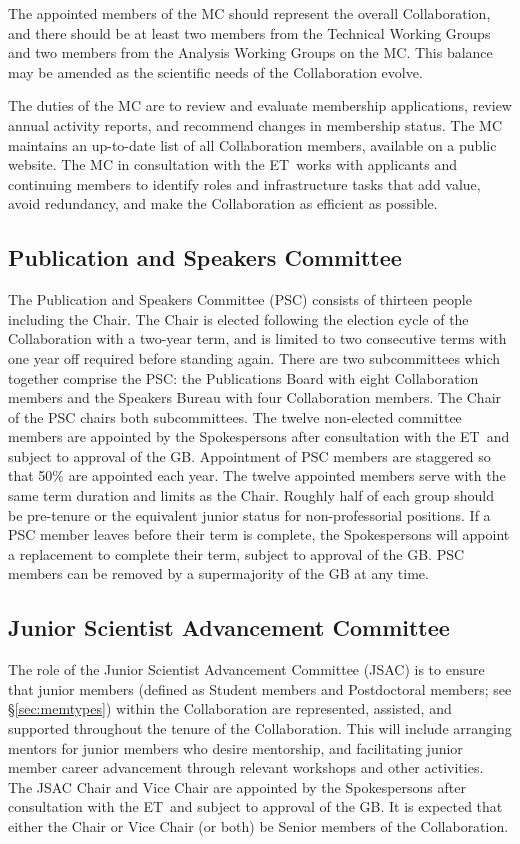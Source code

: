 \documentclass[12pt]{article}
\newcommand{\exec}{{Executive Team}}
\newcommand{\shorte}{{ET}}  %
\begin{document}
The appointed members of the MC should represent the overall Collaboration, and there should be at least two members from the Technical Working Groups and two members from the Analysis Working Groups on the MC.  This balance may be amended as the scientific needs of the Collaboration evolve.

The duties of the MC  are to review and evaluate membership applications, review annual activity reports, and recommend changes in membership status. The MC maintains an up-to-date list of all Collaboration members, available on a public website.  The MC in consultation with the \shorte\ works with applicants and continuing members to identify roles and infrastructure tasks that add value, avoid redundancy, and make the Collaboration as efficient as possible.

\subsection{Publication and Speakers  Committee}
\label{sec:pubcouncil}

The Publication and Speakers Committee (PSC) consists of thirteen people including the Chair. The Chair is elected following the election cycle of the Collaboration with a two-year term, and is limited to two consecutive terms with one year off required before standing again. There are two subcommittees which together comprise the PSC: the Publications Board with eight Collaboration members and the Speakers Bureau with four Collaboration members. The Chair of the PSC chairs both subcommittees. The twelve non-elected committee members are appointed by the Spokespersons after consultation with the \shorte\ and subject to approval of the GB. Appointment of PSC members are staggered so that 50\% are appointed each year. The twelve appointed members serve with the same term duration and limits as the Chair. Roughly half of each group should be pre-tenure or the equivalent junior status for non-professorial positions. If a PSC member leaves before their term is complete, the Spokespersons
will appoint a replacement to complete their term, subject to approval of the GB. PSC members can be removed by a supermajority of the GB at any time.

\subsection{Junior Scientist Advancement Committee}

The role of the Junior Scientist Advancement Committee (JSAC) is to ensure that junior members (defined as Student members and Postdoctoral members; see \S\ref{sec:memtypes}) within the Collaboration are represented, assisted, and supported throughout the  tenure of the Collaboration. This will include arranging mentors for junior members who desire mentorship, and facilitating junior member career advancement through relevant workshops and other activities. The JSAC Chair and Vice Chair are appointed by the Spokespersons after consultation with the \shorte\ and subject to approval of the GB. It is expected that either the Chair or Vice Chair (or both) be Senior members of the Collaboration.
\end{document}
